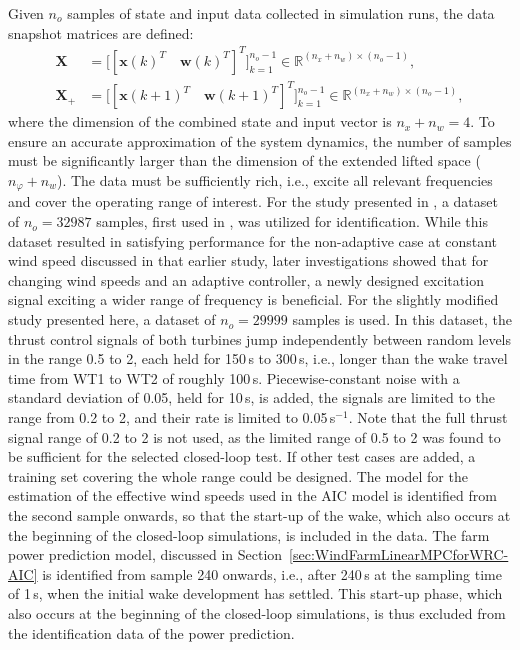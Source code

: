 Given $n_o$ samples of state and input data collected in simulation runs, the data snapshot matrices are defined:
\begin{align} \label{eq:DataCollAIC}
    \bm{X} &= \bigl[ [\bm{x}(k)^T \quad \bm{w}(k)^T]^T \bigr]_{k=1}^{n_o-1} \in \mathbb{R}^{(n_x+n_w)\times (n_o-1)}, \\
    \bm{X}_{+} &= \bigl[ [\bm{x}(k+1)^T\quad \bm{w}(k+1)^T]^T \bigr]_{k=1}^{n_o-1} \in \mathbb{R}^{(n_x+n_w)\times (n_o-1)},
\end{align}
where the dimension of the combined state and input vector is $n_x + n_w = 4$. To ensure an accurate approximation of the system dynamics, the number of samples must be significantly larger than the dimension of the extended lifted space ($n_\varphi + n_w$). The data must be sufficiently rich, i.e., excite all relevant frequencies and cover the operating range of interest. For the study presented in \cite{dittmer2022data}, a dataset of $n_o = 32987$ samples, first used in \cite{sharan2022Koopman}, was utilized for identification. While this dataset resulted in satisfying performance for the non-adaptive case at constant wind speed discussed in that earlier study, later investigations showed that for changing wind speeds and an adaptive controller, a newly designed excitation signal exciting a wider range of frequency is beneficial. For the slightly modified study presented here, a dataset of $n_o = 29999$ samples is used. In this dataset, the thrust control signals of both turbines jump independently between random levels in the range 0.5 to 2, each held for 150\,s to 300\,s, i.e., longer than the wake travel time from WT1 to WT2 of roughly 100\,s. Piecewise-constant noise with a standard deviation of 0.05, held for 10\,s, is added, the signals are limited to the range from 0.2 to 2, and their rate is limited to 0.05\,s$^{-1}$. Note that the full thrust signal range of 0.2 to 2 is not used, as the limited range of 0.5 to 2 was found to be sufficient for the selected closed-loop test. If other test cases are added, a training set covering the whole range could be designed. The model for the estimation of the effective wind speeds used in the AIC model is identified from the second sample onwards, so that the start-up of the wake, which also occurs at the beginning of the closed-loop simulations, is included in the data. The farm power prediction model, discussed in Section~\ref{sec:WindFarmLinearMPCforWRC-AIC} is identified from sample 240 onwards, i.e., after 240\,s at the sampling time of 1\,s, when the initial wake development has settled. This start-up phase, which also occurs at the beginning of the closed-loop simulations, is thus excluded from the identification data of the power prediction.

